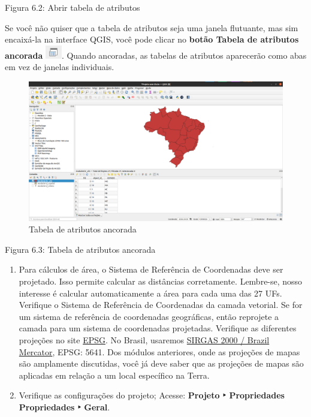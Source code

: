 \documentclass[
]{book}
\begin{document}
Figura 6.2: Abrir tabela de atributos

Se você não quiser que a tabela de atributos seja uma janela flutuante, mas sim encaixá-la na interface QGIS, você pode clicar no \textbf{botão Tabela de atributos ancorada} \includegraphics{media/modulo6/dock-attr-btn.png}. Quando ancoradas, as tabelas de atributos aparecerão como abas em vez de janelas individuais.

\begin{figure}
\centering
\includegraphics{media/modulo6/docked-attribute-tab.png}
\caption{Tabela de atributos ancorada}
\end{figure}

Figura 6.3: Tabela de atributos ancorada

\begin{enumerate}
\def\labelenumi{\arabic{enumi}.}
\setcounter{enumi}{2}
\item
  Para cálculos de área, o Sistema de Referência de Coordenadas deve ser projetado. Isso permite calcular as distâncias corretamente. Lembre-se, nosso interesse é calcular automaticamente a área para cada uma das 27 UFs. Verifique o Sistema de Referência de Coordenadas da camada vetorial. Se for um sistema de referência de coordenadas geográficas, então reprojete a camada para um sistema de coordenadas projetadas. Verifique as diferentes projeções no site \href{https://epsg.io/?q=Brazil+kind\%3APROJCRS}{EPSG}. No Brasil, usaremos \href{https://epsg.io/5641}{SIRGAS 2000 / Brazil Mercator}, EPSG: 5641. Dos módulos anteriores, onde as projeções de mapas são amplamente discutidas, você já deve saber que as projeções de mapas são aplicadas em relação a um local específico na Terra.
\item
  Verifique as configurações do projeto; Acesse: \textbf{Projeto ‣ Propriedades Propriedades ‣ Geral}.
\end{enumerate}
\end{document}
